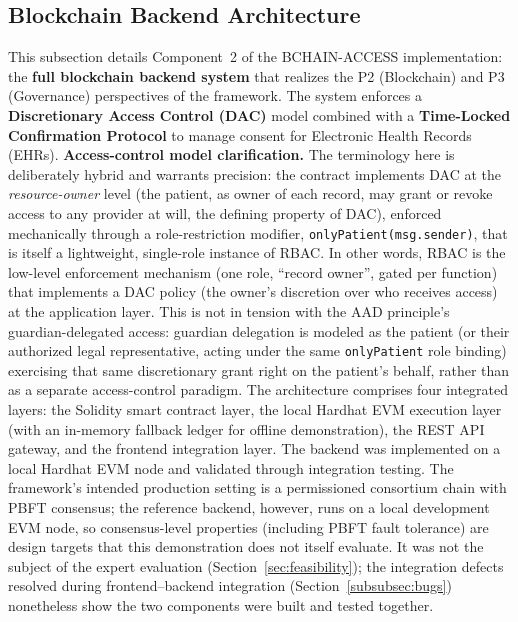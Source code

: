 \documentclass[journal,onecolumn]{IEEEtran}
\begin{document}
\subsection{Blockchain Backend Architecture}
\label{subsec:blockchain-architecture}

This subsection details Component~2 of the BCHAIN-ACCESS implementation: the \textbf{full blockchain backend system} that realizes the P2 (Blockchain) and P3 (Governance) perspectives of the framework. The system enforces a \textbf{Discretionary Access Control (DAC)} model combined with a \textbf{Time-Locked Confirmation Protocol} to manage consent for Electronic Health Records (EHRs). \textbf{Access-control model clarification.} The terminology here is deliberately hybrid and warrants precision: the contract implements DAC at the \emph{resource-owner} level (the patient, as owner of each record, may grant or revoke access to any provider at will, the defining property of DAC), enforced mechanically through a role-restriction modifier, \texttt{onlyPatient(msg.sender)}, that is itself a lightweight, single-role instance of RBAC. In other words, RBAC is the low-level enforcement mechanism (one role, ``record owner'', gated per function) that implements a DAC policy (the owner's discretion over who receives access) at the application layer. This is not in tension with the AAD principle's guardian-delegated access: guardian delegation is modeled as the patient (or their authorized legal representative, acting under the same \texttt{onlyPatient} role binding) exercising that same discretionary grant right on the patient's behalf, rather than as a separate access-control paradigm. The architecture comprises four integrated layers: the Solidity smart contract layer, the local Hardhat EVM execution layer (with an in-memory fallback ledger for offline demonstration), the REST API gateway, and the frontend integration layer. The backend was implemented on a local Hardhat EVM node and validated through integration testing. The framework's intended production setting is a permissioned consortium chain with PBFT consensus; the reference backend, however, runs on a local development EVM node, so consensus-level properties (including PBFT fault tolerance) are design targets that this demonstration does not itself evaluate. It was not the subject of the expert evaluation (Section~\ref{sec:feasibility}); the integration defects resolved during frontend--backend integration (Section~\ref{subsubsec:bugs}) nonetheless show the two components were built and tested together.
\end{document}
